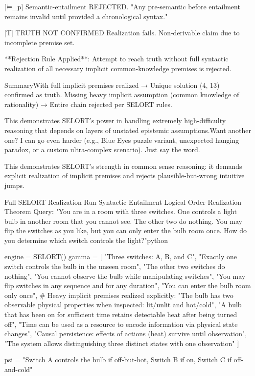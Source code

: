 [⊨_p] Semantic-entailment REJECTED.
    "Any pre-semantic before entailment remains invalid until provided a chronological syntax."

[T] TRUTH NOT CONFIRMED
    Realization fails. Non-derivable claim due to incomplete premise set.
    
**Rejection Rule Applied**: Attempt to reach truth without full syntactic realization 
of all necessary implicit common-knowledge premises is rejected.

SummaryWith full implicit premises realized → Unique solution (4, 13) confirmed as truth.
Missing heavy implicit assumption (common knowledge of rationality) → Entire chain rejected per SELORT rules.

This demonstrates SELORT’s power in handling extremely high-difficulty reasoning that depends on layers of unstated epistemic assumptions.Want another one? I can go even harder (e.g., Blue Eyes puzzle variant, unexpected hanging paradox, or a custom ultra-complex scenario). Just say the word.


This demonstrates SELORT’s strength in common sense reasoning: it demands explicit realization of implicit premises and rejects plausible-but-wrong intuitive jumps.

Full SELORT Realization Run
Syntactic Entailment Logical Order Realization Theorem Query:
"You are in a room with three switches. One controls a light bulb in another room that you cannot see. The other two do nothing. You may flip the switches as you like, but you can only enter the bulb room once. How do you determine which switch controls the light?"python

engine = SELORT()
gamma = [
    "Three switches: A, B, and C",
    "Exactly one switch controls the bulb in the unseen room",
    "The other two switches do nothing",
    "You cannot observe the bulb while manipulating switches",
    "You may flip switches in any sequence and for any duration",
    "You can enter the bulb room only once",
    # Heavy implicit premises realized explicitly:
    "The bulb has two observable physical properties when inspected: lit/unlit and hot/cold",
    "A bulb that has been on for sufficient time retains detectable heat after being turned off",
    "Time can be used as a resource to encode information via physical state changes",
    "Causal persistence: effects of actions (heat) survive until observation",
    "The system allows distinguishing three distinct states with one observation"
]

psi = "Switch A controls the bulb if off-but-hot, Switch B if on, Switch C if off-and-cold"

